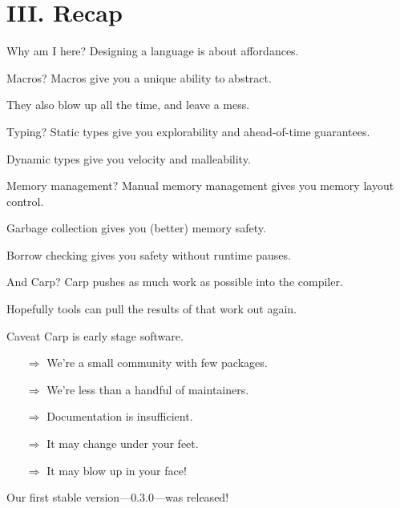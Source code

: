 \documentclass[14pt,aspectratio=169]{beamer}
\begin{document}
  \section{III. Recap}
  \begin{frame}{Why am I here?}
    Designing a language is about affordances.
  \end{frame}
  \begin{frame}{Macros?}
    Macros give you a unique ability to abstract.
    \linebreak

    They also blow up all the time, and leave a mess.
  \end{frame}
  \begin{frame}{Typing?}
    Static types give you explorability and ahead-of-time guarantees.
    \linebreak

    Dynamic types give you velocity and malleability.
  \end{frame}
  \begin{frame}{Memory management?}
    Manual memory management gives you memory layout control.
    \linebreak

    Garbage collection gives you (better) memory safety.
    \linebreak

    Borrow checking gives you safety without runtime pauses.
  \end{frame}
  \begin{frame}{And Carp?}
    Carp pushes as much work as possible into the compiler. \linebreak

    Hopefully tools can pull the results of that work out again.
  \end{frame}
  \begin{frame}{Caveat}
    Carp is early stage software.
    \begin{itemize}
      \item[$\Rightarrow$] We’re a small community with few packages.
      \item[$\Rightarrow$] We’re less than a handful of maintainers.
      \item[$\Rightarrow$] Documentation is insufficient.
      \item[$\Rightarrow$] It may change under your feet.
      \item[$\Rightarrow$] It may blow up in your face!
    \end{itemize}
    Our first stable version—0.3.0—was released!
  \end{frame}
\end{document}
